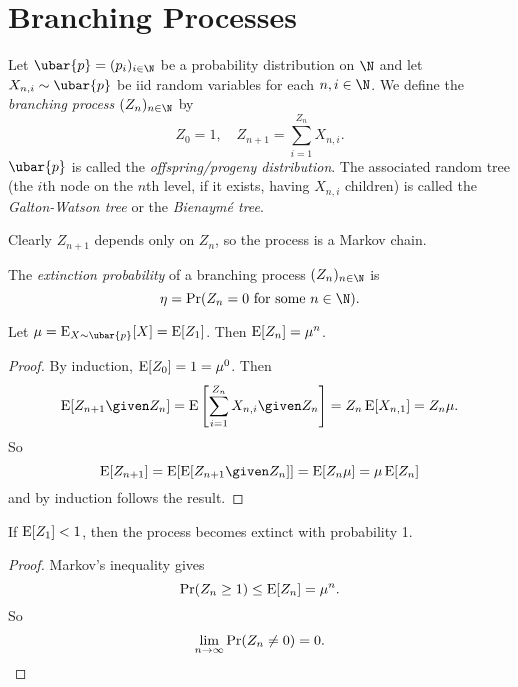 \chapter{Branching Processes} \label{chp:branching}
\begin{definition*} \label{def:branching_process}
    Let $\ubar{p} = (p_i)_{i \in \N}$ be a probability distribution on $\N$ and let
    $X_{n, i} \sim \ubar{p}$ be iid random variables for each $n, i \in \N$.
    We define the \emph{branching process} $(Z_n)_{n \in \N}$ by
    \[
        Z_0 = 1, \quad Z_{n+1} = \sum_{i=1}^{Z_n} X_{n, i}.
    \]
    $\ubar{p}$ is called the \emph{offspring/progeny distribution}.
    The associated random tree (the $i$th node on the $n$th level, if it
    exists, having $X_{n, i}$ children) is called the
    \emph{Galton-Watson tree} or the \emph{Bienaym\'e tree}.
\end{definition*}

Clearly $Z_{n+1}$ depends only on $Z_n$, so the process is a Markov chain.
\begin{definition}[Extinction] \label{def:extinction}
    The \emph{extinction probability} of a branching process
    $(Z_n)_{n \in \N}$ is \[
        \eta = \Pr(Z_n = 0 \text{ for some } n \in \N).
    \]
\end{definition}

\begin{proposition*}[Expectation] \label{thm:expectation}
    Let $\mu = \E_{X \sim \ubar{p}}[X] = \E[Z_1]$.
    Then $\operatorname{\mathrm{E}}[Z_n] = \mu^n$.
\end{proposition*}
\begin{proof}
    By induction, $\operatorname{\mathrm{E}}[Z_0] = 1 = \mu^0$.
    Then \[
        \E[Z_{n+1} \given Z_n]
            = \E\left[\sum_{i=1}^{Z_n} X_{n, i} \given Z_n\right]
            = Z_n \E[X_{n, 1}]
            = Z_n \mu.
    \] So \[
        \E[Z_{n+1}]
            = \E[\E[Z_{n+1} \given Z_n]]
            = \E[Z_n \mu]
            = \mu \E[Z_n]
    \] and by induction follows the result.
\end{proof}

\begin{proposition}
    If $\operatorname{\mathrm{E}}[Z_1] < 1$, then the process becomes extinct with probability 1.
\end{proposition}
\begin{proof}
    Markov's inequality gives \[
        \Pr(Z_n \geq 1) \leq \operatorname{\mathrm{E}}[Z_n] = \mu^n.
    \] So \[
        \lim_{n \to \infty} \Pr(Z_n \ne 0) = 0. \qedhere
    \]
\end{proof}

